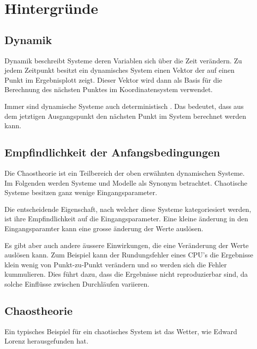 
\section{Hintergründe}

\subsection{Dynamik} %
Dynamik beschreibt Systeme deren Variablen sich über die Zeit verändern. Zu jedem Zeitpunkt besitzt ein dynamisches System einen Vektor der auf einen Punkt im Ergebnisplott zeigt. Dieser Vektor wird dann als Basis für die Berechnung des nächsten Punktes im Koordinatensystem verwendet.

Immer sind dynamische Systeme auch deterministisch \cite{wikidynamicalsystems}. Das bedeutet, dass aus dem jetztigen Ausgangspunkt den nächsten Punkt im System berechnet werden kann.


\subsection{Empfindlichkeit der Anfangsbedingungen}
Die Chaostheorie ist ein Teilbereich der oben erwähnten dynamischen Systeme. Im Folgenden werden Systeme und Modelle als Synonym betrachtet. Chaotische Systeme besitzen ganz wenige Eingangsparameter. %

Die entscheidende Eigenschaft, nach welcher diese Systeme kategoriesiert werden, ist ihre Empfindlichkeit auf die Eingangsparameter. Eine kleine änderung in den Eingangsparamter kann eine grosse änderung der Werte auslösen.

Es gibt aber auch andere äussere Einwirkungen, die eine Veränderung der Werte auslösen kann. Zum Beispiel kann der Rundungsfehler eines CPU's die Ergebnisse klein wenig von Punkt-zu-Punkt verändern und so werden sich die Fehler kummulieren. Dies führt dazu, dass die Ergebnisse nicht reproduzierbar sind, da solche Einflüsse zwischen Durchläufen variieren.

\subsection{Chaostheorie}
Ein typisches Beispiel für ein chaotisches System ist das Wetter, wie Edward Lorenz herausgefunden hat. 

